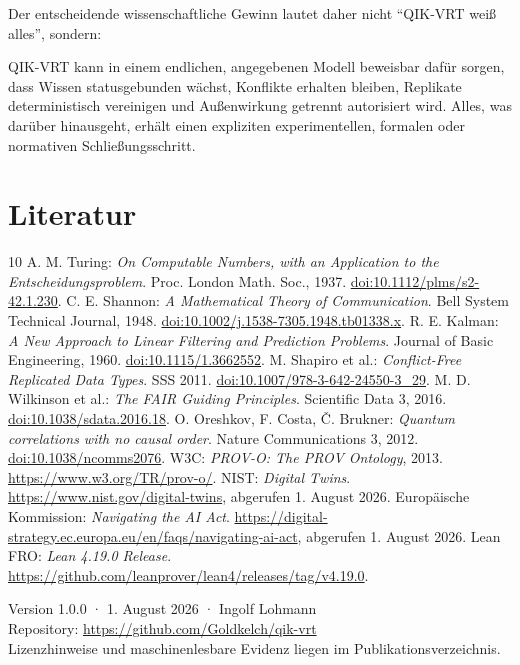 \documentclass[11pt,a4paper,oneside]{article}
\begin{document}
Der entscheidende wissenschaftliche Gewinn lautet daher nicht
\enquote{QIK-VRT weiß alles}, sondern:

\begin{resultbox}
QIK-VRT kann in einem endlichen, angegebenen Modell beweisbar dafür sorgen,
dass Wissen statusgebunden wächst, Konflikte erhalten bleiben, Replikate
deterministisch vereinigen und Außenwirkung getrennt autorisiert wird. Alles,
was darüber hinausgeht, erhält einen expliziten experimentellen, formalen oder
normativen Schließungsschritt.
\end{resultbox}

\section*{Literatur}
\begin{thebibliography}{10}
 A. M. Turing: \emph{On Computable Numbers, with an Application to the Entscheidungsproblem}. Proc. London Math. Soc., 1937. \href{https://doi.org/10.1112/plms/s2-42.1.230}{doi:10.1112/plms/s2-42.1.230}.
 C. E. Shannon: \emph{A Mathematical Theory of Communication}. Bell System Technical Journal, 1948. \href{https://doi.org/10.1002/j.1538-7305.1948.tb01338.x}{doi:10.1002/j.1538-7305.1948.tb01338.x}.
 R. E. Kalman: \emph{A New Approach to Linear Filtering and Prediction Problems}. Journal of Basic Engineering, 1960. \href{https://doi.org/10.1115/1.3662552}{doi:10.1115/1.3662552}.
 M. Shapiro et al.: \emph{Conflict-Free Replicated Data Types}. SSS 2011. \href{https://doi.org/10.1007/978-3-642-24550-3_29}{doi:10.1007/978-3-642-24550-3\_29}.
 M. D. Wilkinson et al.: \emph{The FAIR Guiding Principles}. Scientific Data 3, 2016. \href{https://doi.org/10.1038/sdata.2016.18}{doi:10.1038/sdata.2016.18}.
 O. Oreshkov, F. Costa, Č. Brukner: \emph{Quantum correlations with no causal order}. Nature Communications 3, 2012. \href{https://doi.org/10.1038/ncomms2076}{doi:10.1038/ncomms2076}.
 W3C: \emph{PROV-O: The PROV Ontology}, 2013. \url{https://www.w3.org/TR/prov-o/}.
 NIST: \emph{Digital Twins}. \url{https://www.nist.gov/digital-twins}, abgerufen 1. August 2026.
 Europäische Kommission: \emph{Navigating the AI Act}. \url{https://digital-strategy.ec.europa.eu/en/faqs/navigating-ai-act}, abgerufen 1. August 2026.
 Lean FRO: \emph{Lean 4.19.0 Release}. \url{https://github.com/leanprover/lean4/releases/tag/v4.19.0}.
\end{thebibliography}

\vfill
\begin{center}
\sffamily\small
Version 1.0.0 · 1. August 2026 · Ingolf Lohmann\\
Repository: \url{https://github.com/Goldkelch/qik-vrt}\\
Lizenzhinweise und maschinenlesbare Evidenz liegen im Publikationsverzeichnis.
\end{center}
\end{document}

